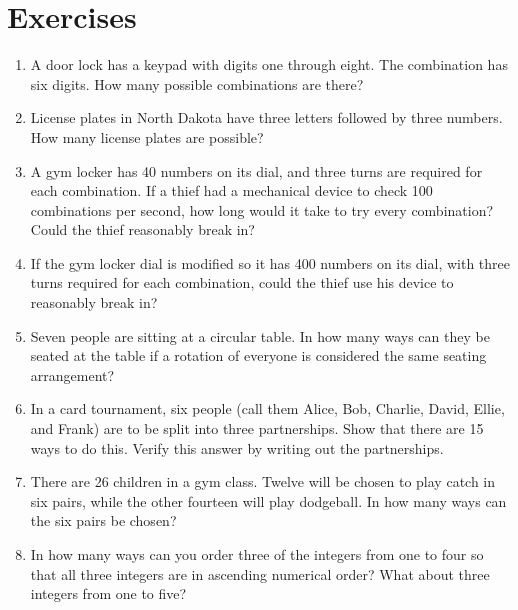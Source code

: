 \documentclass{book}
\theoremstyle{plain}
\theoremstyle{definition}
\newif\ifprintsolutions
\newcommand{\solution}[1]{\ifprintsolutions \begin{sloppypar}{\it #1}\end{sloppypar} \fi} %
\begin{document}
\section{Exercises}
\begin{enumerate}
\item A door lock has a keypad with digits one through eight. The combination has six digits. How many possible combinations are there? \solution{There are $8^6$ possible combinations.}
\item License plates in North Dakota have three letters followed by three numbers. How many license plates are possible? \solution{There are $26^3 \times 10^3$ possible plates.}
\item A gym locker has 40 numbers on its dial, and three turns are required for each combination. If a thief had a mechanical device to check 100 combinations per second, how long would it take to try every combination? Could the thief reasonably break in? \solution{It would take $40^3/100 = 640$ seconds.}
\item If the gym locker dial is modified so it has 400 numbers on its dial, with three turns required for each combination, could the thief use his device to reasonably break in? \solution{It would take $400^3/100 = 640000$ seconds. That's about a week.}
\item Seven people are sitting at a circular table. In how many ways can they be seated at the table if a rotation of everyone is considered the same seating arrangement? \solution{There are $7!/7 = 720$ arrangements.}
\item In a card tournament, six people (call them Alice, Bob, Charlie, David, Ellie, and Frank) are to be split into three partnerships. Show that there are 15 ways to do this. Verify this answer by writing out the partnerships. \solution{$\binom{6}{2}\binom{4}{2}\binom{2}{2}/3! = 15$}
\item There are 26 children in a gym class. Twelve will be chosen to play catch in six pairs, while the other fourteen will play dodgeball. In how many ways can the six pairs be chosen? \solution{$\binom{26}{2}\binom{24}{2}\binom{22}{2}\binom{20}{2}\binom{18}{2}\binom{16}{2}/6! = 100391791500$}
\item In how many ways can you order three of the integers from one to four so that all three integers are in ascending numerical order? What about three integers from one to five? \solution{For four, there are four ways: $123, 124, 134, 234$. For five, there are ten ways: $345, 234, 235, 245, 145, 135, 134, 125, 124, 123$.}

\end{enumerate}
\end{document}
